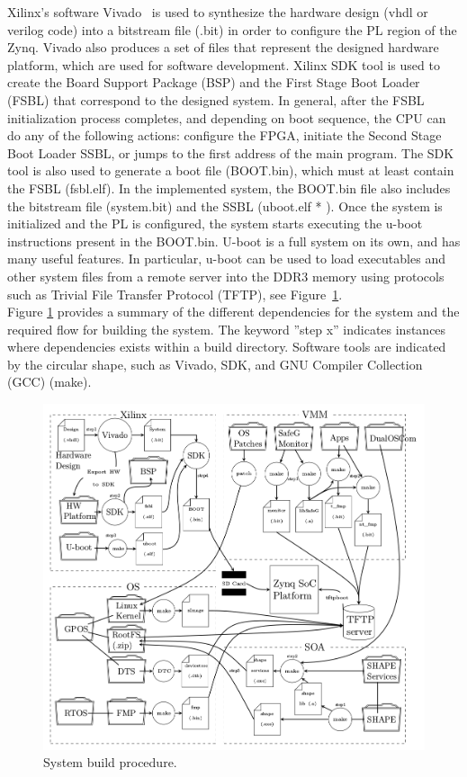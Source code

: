 Xilinx's software Vivado~\cite{website:vivado} is used to synthesize the hardware design (vhdl or verilog code) into a bitstream file (.bit) in order to configure the PL region of the Zynq. Vivado also produces a set of files that represent the designed hardware platform, which are used for software development. Xilinx SDK tool is used to create the Board Support Package (BSP) and the First Stage Boot Loader (FSBL) that correspond to the designed system. In general, after the FSBL initialization process completes, and depending on boot sequence, the CPU can do any of the following actions: configure the FPGA, initiate the Second Stage Boot Loader SSBL, or jumps to the first address of the main program. The SDK tool is also used to generate a boot file (BOOT.bin), which must at least contain the FSBL (fsbl.elf). In the implemented system, the BOOT.bin file also includes the bitstream file (system.bit) and the SSBL (uboot.elf * ). Once the system is initialized and the PL is configured, the system starts executing the u-boot instructions present in the BOOT.bin. U-boot is a full system on its own, and has many useful features. In particular, u-boot can be used to load executables and other system files from a remote server into the DDR3 memory using protocols such as Trivial File Transfer Protocol (TFTP), see Figure~\ref{fig:system_build}.\\

Figure \ref{fig:system_build} provides a summary of the different dependencies for the system and the required flow for building the system. The keyword ”step x” indicates instances where dependencies exists within a build directory. Software tools are indicated by the circular shape, such as Vivado, SDK, and GNU Compiler Collection (GCC) (make).

\begin{figure}[H]
\centering
\includegraphics[width=\textwidth]{./img/literature_build.png}
\caption{System build procedure.\cite{zaki2016}}\label{fig:system_build}
\end{figure}

